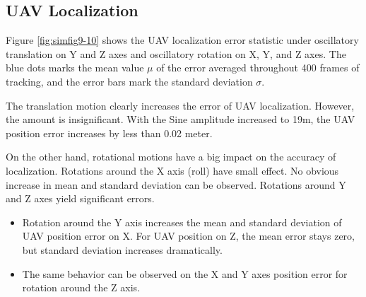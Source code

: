 \subsection{UAV Localization}\label{localization_motion}

Figure \ref{fig:simfig9-10} shows the UAV localization error statistic
under oscillatory translation on Y and Z axes and oscillatory rotation
on X, Y, and Z axes. The blue dots marks the mean value $\mu$ of the
error averaged throughout 400 frames of tracking, and the error bars
mark the standard deviation $\sigma$.

The translation motion clearly increases the error of UAV
localization. However, the amount is insignificant. With the Sine
amplitude increased to 19m, the UAV position error increases by less than
0.02 meter.

On the other hand, rotational motions have a big impact on the accuracy
of localization. Rotations around the X axis (roll) have small effect. No
obvious increase in mean and standard deviation can be
observed. Rotations around Y and Z axes yield significant errors.

\begin{itemize}
  \item Rotation around the Y axis increases the mean and standard deviation
  of UAV position error on X. For UAV position on Z, the mean
  error stays zero, but standard deviation increases dramatically.
  \item The same behavior can be observed on the X and Y axes position
  error for rotation around the Z axis.
\end{itemize}

